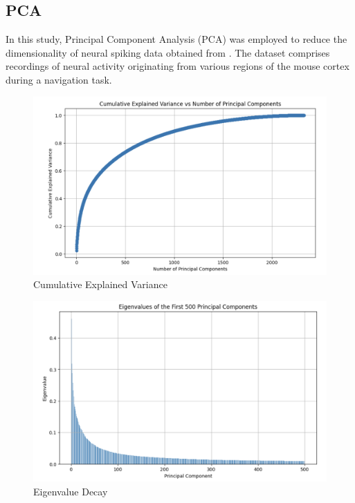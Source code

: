 \documentclass[12pt]{article}
\begin{document}
\subsection{PCA}
In this study, Principal Component Analysis (PCA) was employed to reduce the dimensionality of neural spiking data obtained from \cite{tseng2022shared}. The dataset comprises recordings of neural activity originating from various regions of the mouse cortex during a navigation task. 
\\


\begin{figure}[htbp] %
  \centering
  \includegraphics[width=0.75\linewidth]{explained_variance.png}
  \caption{Cumulative Explained Variance }
  \label{fig:your-label}
\end{figure}

\begin{figure}[htbp] %
  \centering
  \includegraphics[width=0.75\linewidth]{eigenvalue_plot.png}
  \caption{Eigenvalue Decay }
  \label{fig:your-label}
\end{figure}
\newpage
 

\end{document}
